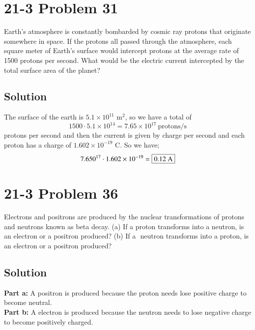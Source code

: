 \documentclass{article}
\begin{document}
\section*{21-3 Problem 31}
Earth’s atmosphere is constantly bombarded by cosmic ray protons that originate somewhere in space.
If the protons all passed through the atmosphere, each square meter of Earth’s surface would intercept protons at the average rate of 1500 protons per second.
What would be the electric current intercepted by the total surface area of the planet?
\subsection*{Solution}
The surface of the earth is $5.1 \times 10^{11}$ m$^2$, so we have a total of
\[
	1500 \cdot 5.1 \times 10^{14} = 7.65 \times 10^{17}\ \text{protons}/\text{s}
\]
protons per second and then the current is given by charge per second and each proton has a charge of $1.602 \times 10^{-19}$ C. So we have;
\[
	7.650 \time 10^{17} \cdot 1.602 \times 10^{-19} = \boxed{0.12\ \text{A}}
\]

\section*{21-3 Problem 36}
Electrons and positrons are produced by the nuclear transformations of protons and neutrons known as beta decay.
(a) If a proton transforms into a neutron, is an electron or a positron produced?
(b) If a ­ neutron transforms into a proton, is an electron or a positron produced?

\subsection*{Solution}
\textbf{Part a:} A positron is produced because the proton needs lose positive charge to become neutral. \vspace{12pt}\\
\textbf{Part b:} A electron is produced because the neutron needs to lose negative charge to become positively charged.
\end{document}
